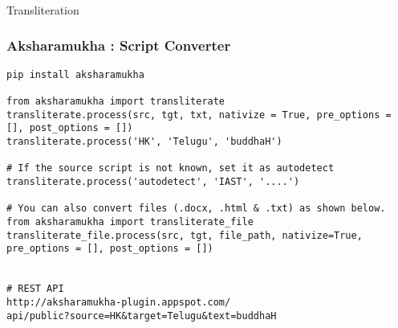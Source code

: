 \begin{frame}[fragile]\frametitle{}
\begin{center}
{\Large Transliteration}
\end{center}
\end{frame}


\begin{frame}[fragile]\frametitle{Aksharamukha : Script Converter}


	\begin{lstlisting}
pip install aksharamukha

from aksharamukha import transliterate
transliterate.process(src, tgt, txt, nativize = True, pre_options = [], post_options = [])
transliterate.process('HK', 'Telugu', 'buddhaH')

# If the source script is not known, set it as autodetect
transliterate.process('autodetect', 'IAST', '....')

# You can also convert files (.docx, .html & .txt) as shown below.
from aksharamukha import transliterate_file
transliterate_file.process(src, tgt, file_path, nativize=True, pre_options = [], post_options = [])


# REST API
http://aksharamukha-plugin.appspot.com/
api/public?source=HK&target=Telugu&text=buddhaH
\end{lstlisting}

\end{frame}


